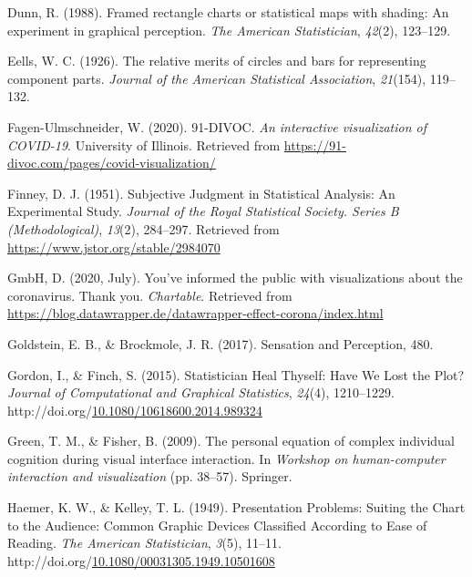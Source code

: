 \documentclass[print]{nuthesis}
\newlength{\cslhangindent}
\newenvironment{CSLReferences}%
{\setlength{\parindent}{0pt}%
\everypar{\setlength{\hangindent}{\cslhangindent}}\ignorespaces}%
{\par}
\begin{document}
\begin{CSLReferences}{1}{0}
\leavevmode\hypertarget{ref-dunn1988framed}{}%
Dunn, R. (1988). Framed rectangle charts or statistical maps with shading: An experiment in graphical perception. \emph{The American Statistician}, \emph{42}(2), 123--129.

\leavevmode\hypertarget{ref-eells1926relative}{}%
Eells, W. C. (1926). The relative merits of circles and bars for representing component parts. \emph{Journal of the American Statistical Association}, \emph{21}(154), 119--132.

\leavevmode\hypertarget{ref-fagen-ulmschneider_2020}{}%
Fagen-Ulmschneider, W. (2020). 91-DIVOC. \emph{An interactive visualization of COVID-19}. University of Illinois. Retrieved from \url{https://91-divoc.com/pages/covid-visualization/}

\leavevmode\hypertarget{ref-finney_subjective_1951}{}%
Finney, D. J. (1951). Subjective {Judgment} in {Statistical} {Analysis}: {An} {Experimental} {Study}. \emph{Journal of the Royal Statistical Society. Series B (Methodological)}, \emph{13}(2), 284--297. Retrieved from \url{https://www.jstor.org/stable/2984070}

\leavevmode\hypertarget{ref-gmbh_youve_2020}{}%
GmbH, D. (2020, July). You've informed the public with visualizations about the coronavirus. {Thank} you. \emph{Chartable}. Retrieved from \url{https://blog.datawrapper.de/datawrapper-effect-corona/index.html}

\leavevmode\hypertarget{ref-goldstein_sensation_2017}{}%
Goldstein, E. B., \& Brockmole, J. R. (2017). Sensation and {Perception}, 480.

\leavevmode\hypertarget{ref-gordon_statistician_2015}{}%
Gordon, I., \& Finch, S. (2015). Statistician {Heal} {Thyself}: {Have} {We} {Lost} the {Plot}? \emph{Journal of Computational and Graphical Statistics}, \emph{24}(4), 1210--1229. http://doi.org/\href{https://doi.org/10.1080/10618600.2014.989324}{10.1080/10618600.2014.989324}

\leavevmode\hypertarget{ref-green2009personal}{}%
Green, T. M., \& Fisher, B. (2009). The personal equation of complex individual cognition during visual interface interaction. In \emph{Workshop on human-computer interaction and visualization} (pp. 38--57). Springer.

\leavevmode\hypertarget{ref-haemer_presentation_1949}{}%
Haemer, K. W., \& Kelley, T. L. (1949). Presentation {Problems}: {Suiting} the {Chart} to the {Audience}: {Common} {Graphic} {Devices} {Classified} {According} to {Ease} of {Reading}. \emph{The American Statistician}, \emph{3}(5), 11--11. http://doi.org/\href{https://doi.org/10.1080/00031305.1949.10501608}{10.1080/00031305.1949.10501608}


\end{CSLReferences}
\end{document}
